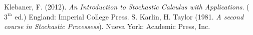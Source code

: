\documentclass[letterpaper]{article}
\newcommand{\1}{\mathds{1}}
\theoremstyle{definition}
\theoremstyle{definition}
\theoremstyle{definition}
\theoremstyle{definition}
\theoremstyle{definition}
\begin{document}
    \begin{thebibliography}{2} %
         Klebaner, F. (2012). \emph{An Introduction to Stochastic Calculus with Applications}. ($3^\text{ra}$ ed.) England: Imperial College Press.
         S. Karlin, H. Taylor (1981. \emph{A second course in Stochastic Processess}). Nueva York: Academic Press, Inc.
\end{thebibliography}
\end{document}
